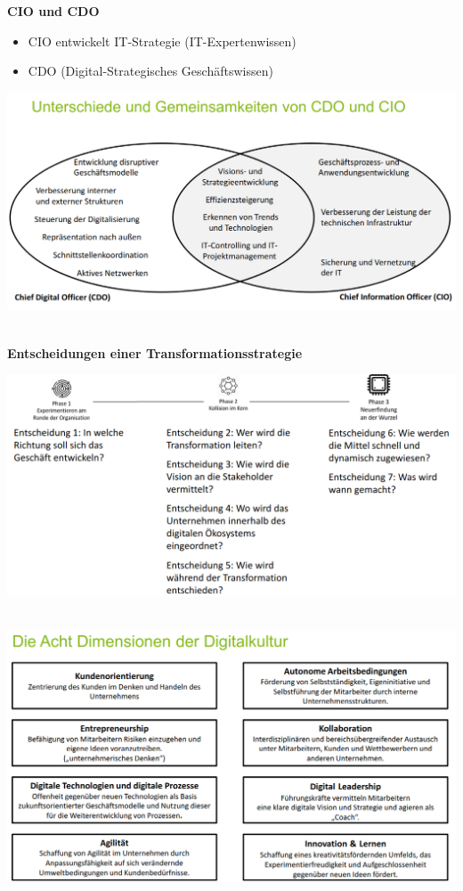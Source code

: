 \documentclass[a4]{scrartcl}
\begin{document}
\begin{itemize}
\end{itemize}

\textbf{CIO und CDO}

\begin{itemize}
\item CIO entwickelt IT-Strategie (IT-Expertenwissen)
\item CDO (Digital-Strategisches Geschäftswissen)
\end{itemize}

\includegraphics[scale=0.3]{ciocdo.png}

\ \\

\textbf{Entscheidungen einer Transformationsstrategie}

\includegraphics[scale=0.27]{dec.png}

\ \\

\includegraphics[scale=0.4]{8.png}
\end{document}

